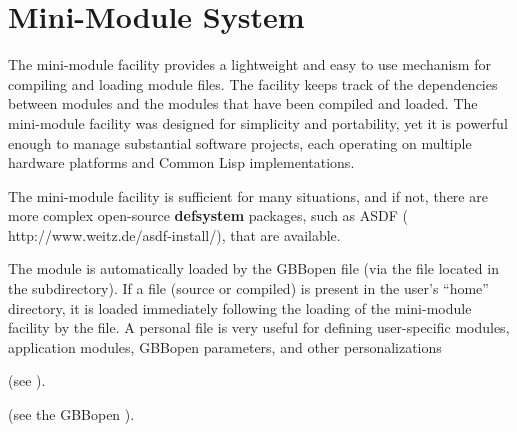 \documentclass[10pt,twoside,english,pdftex]{article}
\begin{document}
\T\markright{}%
\T\pagestyle{plain}
\T\cleardoublepage
\W{}
\T\pagestyle{fancy}
\T\thispagestyle{fancybottom}
\T\global\def\fnlastname{ }%
\T\renewcommand{\headrulewidth}{0pt}
\section{Mini-Module System}
\label{sec:mini-module}%

%
%
%
%
%
%
%
%
%
The mini-module facility provides a lightweight and easy to use mechanism
for compiling and loading module files.  The facility keeps track of the
dependencies between modules and the modules that have been compiled and
loaded. The mini-module facility was designed for simplicity and
portability, yet it is powerful enough to manage substantial software
projects, each operating on multiple hardware platforms and Common Lisp
implementations.

The mini-module facility is sufficient for many situations, and if not,
there are more complex open-source \textbf{defsystem} packages, such as ASDF
(%
{http://www.weitz.de/asdf-install/}), that are available.

%
%
%
%
%
The  module is automatically loaded by the GBBopen
\mbox{} file (via the
 file located in the 
subdirectory). If a  file (source or compiled)
is present in the user's ``home'' directory, it is loaded immediately
following the loading of the mini-module facility by the
 file.  A personal  file is
very useful for defining user-specific modules, application modules,
GBBopen parameters, and other personalizations
\W\begin{iftex}
  (see ).
\W\end{iftex}
\T\begin{ifhtml}
  (see the GBBopen ).
\T\end{ifhtml}
\end{document}
